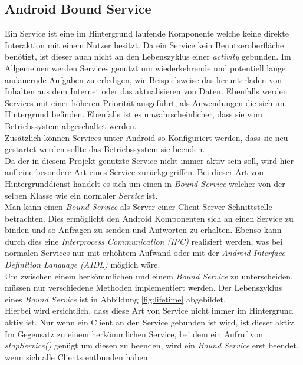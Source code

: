 \documentclass[]{report}
\begin{document}
\subsection{Android Bound Service}
Ein Service ist eine im Hintergrund laufende Komponente welche keine direkte Interaktion mit einem Nutzer besitzt. Da ein Service kein Benutzeroberfläche benötigt, ist dieser auch nicht an den Lebenszyklus einer \textit{activity} gebunden. Im Allgemeinen werden Services genutzt um wiederkehrende und potentiell lange andauernde Aufgaben zu erledigen, wie Beispielsweise das herunterladen von Inhalten aus dem Internet oder das aktualisieren von Daten. Ebenfalls werden Services mit einer höheren Priorität ausgeführt, als Anwendungen die sich im Hintergrund befinden. Ebenfalls ist es unwahrscheinlicher, dass sie vom Betriebssystem abgeschaltet werden. \\
Zusätzlich können Services unter Android so Konfiguriert werden, dass sie neu gestartet werden sollte das Betriebssystem sie beenden. \\
Da der in diesem Projekt genutzte Service nicht immer aktiv sein soll, wird hier auf eine besondere Art eines Service zurückgegriffen. Bei dieser Art von Hintergrunddienst handelt es sich um einen in \textit{Bound Service}\cite{BoundService} welcher von der selben Klasse wie ein normaler \textit{Service} ist. \\
Man kann einen \textit{Bound Service} als Server einer Client-Server-Schnittstelle betrachten. Dies ermöglicht den Android Komponenten sich an einen Service zu binden und so Anfragen zu senden und Antworten zu erhalten. Ebenso kann durch dies eine \textit{Interprocess Communication (IPC)} realisiert werden, was bei normalen Services nur mit erhöhtem Aufwand oder mit der \textit{Android Interface Definition Language (AIDL)} möglich wäre. \\
Um zwischen einem herkömmlichen und einem \textit{Bound Service} zu unterscheiden, müssen nur verschiedene Methoden implementiert werden. Der Lebenszyklus eines \textit{Bound Service} ist in Abbildung \ref{fig:lifetime} abgebildet. \\
Hierbei wird ersichtlich, dass diese Art von Service nicht immer im Hintergrund aktiv ist. Nur wenn ein Client an den Service gebunden ist wird, ist dieser aktiv. Im Gegensatz zu einem herkömmlichen Service, bei dem ein Aufruf von \textit{stopService()} genügt um diesen zu beenden, wird ein \textit{Bound Service} erst beendet, wenn sich alle Clients entbunden haben.
\end{document}
